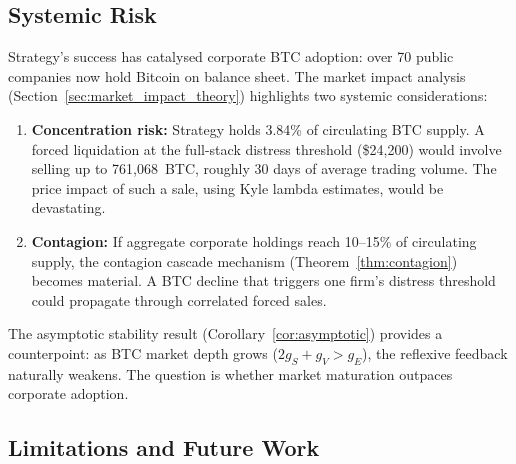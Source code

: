 \subsection{Systemic Risk}

Strategy's success has catalysed corporate BTC adoption: over 70 public
companies now hold Bitcoin on balance sheet.  The market impact analysis
(Section~\ref{sec:market_impact_theory}) highlights two systemic
considerations:

\begin{enumerate}
  \item \textbf{Concentration risk:} Strategy holds 3.84\% of circulating
    BTC supply.  A forced liquidation at the full-stack distress threshold
    (\$24,200) would involve selling up to 761,068~BTC, roughly 30 days
    of average trading volume.  The price impact of such a sale, using
    Kyle lambda estimates, would be devastating.
  \item \textbf{Contagion:} If aggregate corporate holdings reach
    10--15\% of circulating supply, the contagion cascade mechanism
    (Theorem~\ref{thm:contagion}) becomes material.  A BTC decline that
    triggers one firm's distress threshold could propagate through
    correlated forced sales.
\end{enumerate}

The asymptotic stability result (Corollary~\ref{cor:asymptotic}) provides
a counterpoint: as BTC market depth grows ($2g_S + g_V > g_E$), the
reflexive feedback naturally weakens.  The question is whether market
maturation outpaces corporate adoption.

\subsection{Limitations and Future Work}

